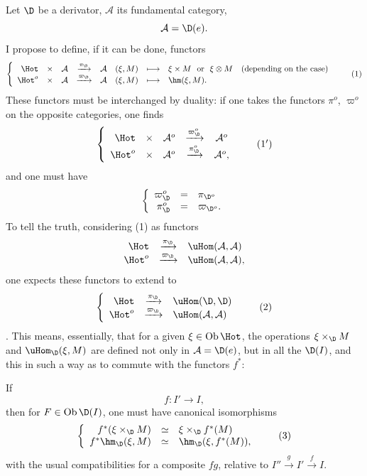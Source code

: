 Let $\D$ be a derivator, $\mathcal{A}$ its fundamental category,
\[
\mathcal{A} = \D(e).
\]
I propose to define, if it can be done, functors
\[
\left\{
\begin{array}{rccccccl}
\Hot & \times & \mathcal{A} & \xrightarrow{\pi_{\D}} & \mathcal{A} & (\xi, M) & \longmapsto & \xi \times M \ \text{ or } \ \xi \otimes M \quad \text{(depending on the case)}\\
\Hot^o & \times & \mathcal{A} & \xrightarrow{\varpi_{\D}} & \mathcal{A} & (\xi, M) & \longmapsto & \hm(\xi, M).
\end{array}
\right.
\tag*{(1)}
\]
These functors must be interchanged by duality: if one takes the functors $\pi^o$, $\varpi^o$ on the opposite categories, one finds
\[
\left\{
\begin{array}{rcccc}
\Hot & \times & \mathcal{A}^o & \xrightarrow{\varpi^o_{\D}} & \mathcal{A}^o\\
\Hot^o & \times & \mathcal{A}^o & \xrightarrow{\pi^o_{\D}} & \mathcal{A}^o,
\end{array}
\right.
\tag*{(1$'$)}
\]
and one must have
\[
\left\{
\begin{array}{rcl}
\varpi^o_{\D} & = & \pi_{\D^o}\\
\pi^o_{\D} & = & \varpi_{\D^o}.
\end{array}
\right.
\]
To tell the truth, considering (1) as functors
\[
\begin{array}{rcl}
\Hot & \xrightarrow{\pi_{\D}} & \uHom(\mathcal{A}, \mathcal{A})\\
\Hot^o & \xrightarrow{\varpi_{\D}} & \uHom(\mathcal{A}, \mathcal{A}),
\end{array}
\]
one expects these functors to extend to
\[
\left\{
\begin{array}{rcl}
\Hot & \xrightarrow{\pi_{\D}} & \uHom(\D, \D)\\
\Hot^o & \xrightarrow{\varpi_{\D}} & \uHom(\mathcal{A}, \mathcal{A})
\end{array}
\right.
\tag*{(2)}
\]
. This means, essentially, that for a given $\xi \in \mathrm{Ob}\,\Hot$, the operations $\xi \times_{\D} M$ and $\uHom_{\D}(\xi, M)$ are defined not only in $\mathcal{A} = \D(e)$, but in all the $\D(I)$, and this in such a way as to commute with the functors $f^*$:

If
\[
f : I' \longrightarrow I,
\]
then for $F \in \mathrm{Ob}\,\D(I)$, one must have canonical isomorphisms
\[
\left\{
\begin{array}{rcl}
f^*(\xi \times_{\D} M) & \simeq & \xi \times_{\D} f^*(M)\\
f^*\hm_{\D}(\xi, M) & \simeq & \hm_{\D}(\xi, f^*(M)),
\end{array}
\right.
\tag*{(3)}
\]
with the usual compatibilities for a composite $fg$, relative to $I'' \xrightarrow{g} I' \xrightarrow{f} I$.


